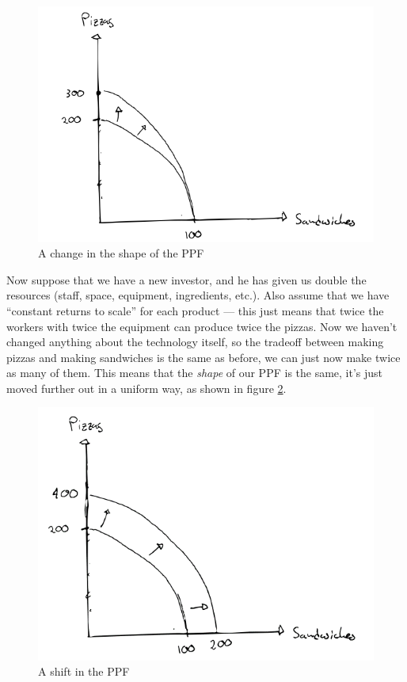 \documentclass[12pt]{article}
\begin{document}
\begin{figure}
    \centering
    \includegraphics[width=.75\textwidth]{PPFshape.png}
    \caption{A change in the shape of the PPF}
    \label{fig:PPFshape}
\end{figure}

\medskip

Now suppose that we have a new investor, and he has given us double the resources (staff, space, equipment, ingredients, etc.). Also assume that we have ``constant returns to scale'' for each product --- this just means that twice the workers with twice the equipment can produce twice the pizzas. Now we haven't changed anything about the technology itself, so the tradeoff between making pizzas and making sandwiches is the same as before, we can just now make twice as many of them. This means that the \textit{shape} of our PPF is the same, it's just moved further out in a uniform way, as shown in figure \ref{fig:PPFshift}.

\begin{figure}
    \centering
    \includegraphics[width=.75\textwidth]{PPFshift.png}
    \caption{A shift in the PPF}
    \label{fig:PPFshift}
\end{figure}
\end{document}
